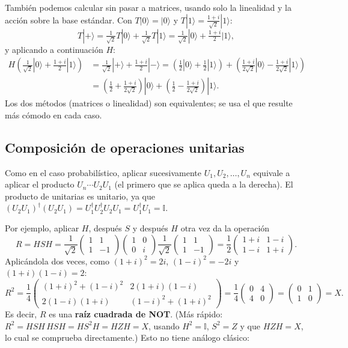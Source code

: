 \documentclass[11pt, a4paper, twoside, openright]{report}
\begin{document}
\noindent También podemos calcular sin pasar a matrices, usando solo la linealidad y la acción sobre la base estándar. Con $T|0\rangle = |0\rangle$ y $T|1\rangle = \frac{1+i}{\sqrt 2}|1\rangle$:
\[
T|+\rangle = \tfrac{1}{\sqrt 2}T|0\rangle + \tfrac{1}{\sqrt 2}T|1\rangle = \tfrac{1}{\sqrt 2}|0\rangle + \tfrac{1+i}{2}|1\rangle,
\]
y aplicando a continuación $H$:
\begin{align*}
H\left(\tfrac{1}{\sqrt 2}|0\rangle + \tfrac{1+i}{2}|1\rangle\right)
&= \tfrac{1}{\sqrt 2}|+\rangle + \tfrac{1+i}{2}|-\rangle
= \left(\tfrac12|0\rangle + \tfrac12|1\rangle\right) + \left(\tfrac{1+i}{2\sqrt 2}|0\rangle - \tfrac{1+i}{2\sqrt 2}|1\rangle\right) \\
&= \left(\tfrac12 + \tfrac{1+i}{2\sqrt 2}\right)|0\rangle + \left(\tfrac12 - \tfrac{1+i}{2\sqrt 2}\right)|1\rangle.
\end{align*}
Los dos métodos (matrices o linealidad) son equivalentes; se usa el que resulte más cómodo en cada caso.

\subsection{Composición de operaciones unitarias}

\noindent Como en el caso probabilístico, aplicar sucesivamente $U_1, U_2, \dots, U_n$ equivale a aplicar el producto $U_n \cdots U_2 U_1$ (el primero que se aplica queda a la derecha). El producto de unitarias es unitario, ya que $(U_2U_1)^\dagger(U_2U_1) = U_1^\dagger U_2^\dagger U_2 U_1 = U_1^\dagger U_1 = \mathbb{I}$.

\noindent Por ejemplo, aplicar $H$, después $S$ y después $H$ otra vez da la operación
\[
R = HSH = \frac{1}{\sqrt 2}\begin{pmatrix} 1 & 1 \\ 1 & -1 \end{pmatrix}\begin{pmatrix} 1 & 0 \\ 0 & i \end{pmatrix}\frac{1}{\sqrt 2}\begin{pmatrix} 1 & 1 \\ 1 & -1 \end{pmatrix}
= \frac12\begin{pmatrix} 1+i & 1-i \\ 1-i & 1+i \end{pmatrix}.
\]
Aplicándola dos veces, como $(1+i)^2 = 2i$, $(1-i)^2 = -2i$ y $(1+i)(1-i) = 2$:
\[
R^2 = \frac14\begin{pmatrix} (1+i)^2 + (1-i)^2 & 2(1+i)(1-i) \\ 2(1-i)(1+i) & (1-i)^2 + (1+i)^2 \end{pmatrix}
= \frac14\begin{pmatrix} 0 & 4 \\ 4 & 0 \end{pmatrix} = \begin{pmatrix} 0 & 1 \\ 1 & 0 \end{pmatrix} = X.
\]
Es decir, $R$ es una \textbf{raíz cuadrada de NOT}. (Más rápido: $R^2 = HSH\,HSH = HS^2H = HZH = X$, usando $H^2 = \mathbb{I}$, $S^2 = Z$ y que $HZH = X$, lo cual se comprueba directamente.) Esto no tiene análogo clásico:
\end{document}
